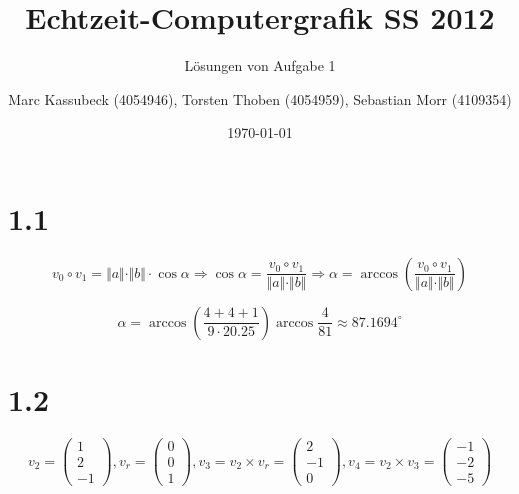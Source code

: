 \documentclass[a4paper]{scrartcl}
\title{Echtzeit-Computergrafik SS 2012}
\subtitle{Lösungen von Aufgabe 1}
\author{\small Marc Kassubeck (4054946), Torsten Thoben (4054959), Sebastian Morr (4109354)}
\date{\today}
\begin{document}
\maketitle

\section*{1.1}

\[
	v_0 \circ v_1 = \Vert a\Vert \cdot \Vert b\Vert \cdot \cos \alpha
	\Rightarrow \cos \alpha = \frac{v_0 \circ v_1}{\Vert a\Vert \cdot \Vert b\Vert}
	\Rightarrow \alpha = \arccos \left(\frac{v_0 \circ v_1}{\Vert a\Vert \cdot \Vert b\Vert}\right)
\]

\[
	\alpha = \arccos \left( \frac{4 + 4 + 1}{9 \cdot 20.25} \right) \arccos \frac{4}{81} \approx 87.1694^\circ
\]

\section*{1.2}


\[
	v_2 = \begin{pmatrix}
	1 \\ 2 \\ -1
	\end{pmatrix}, v_r = \begin{pmatrix}
	0 \\ 0 \\ 1
	\end{pmatrix}, v_3 = v_2 \times v_r = \begin{pmatrix}
	2 \\ -1 \\ 0
	\end{pmatrix},
	v_4 = v_2 \times v_3 = \begin{pmatrix}
	-1 \\ -2 \\ -5
	\end{pmatrix}
\]
\end{document}
